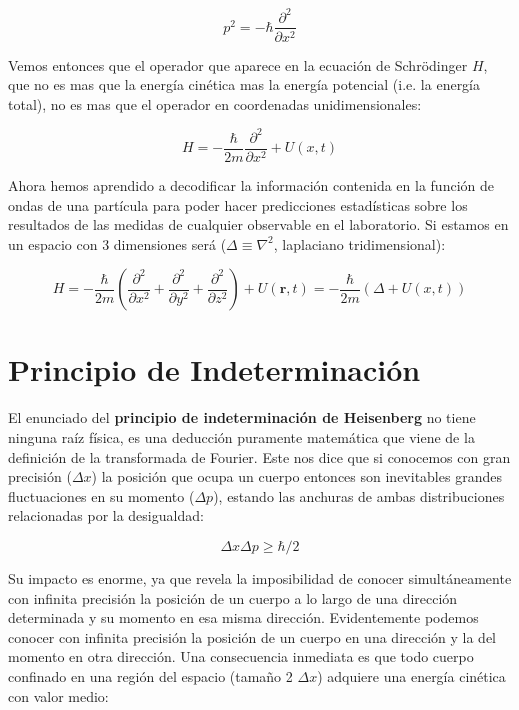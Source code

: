 \documentclass[12pt,a4paper]{article}
\numberwithin{equation}{section}
\numberwithin{figure}{section}
\newcommand{\parentesis}[1]{\left( #1  \right)}
\newcommand{\parciales}[2]{\frac{\partial #1}{\partial #2}}
\newcommand{\rn}{\mathbf{r}}
\begin{document}
\begin{equation}
p^2 = - \hbar \parciales{^2}{x^2}
\end{equation} 

Vemos entonces que el operador que aparece en la ecuación de Schrödinger $H$, que no es mas que la energía cinética mas la energía potencial (i.e. la energía total), no es mas que el operador en coordenadas unidimensionales:


\begin{equation}
H = - \dfrac{\hbar}{2 m} \parciales{^2}{x^2} + U(x,t)
\end{equation}

Ahora hemos aprendido a decodificar la información contenida en la función de ondas de una partícula para poder hacer predicciones estadísticas sobre los resultados de las medidas de cualquier observable en el laboratorio. Si estamos en un espacio con 3 dimensiones será ($\Delta \equiv \nabla^2$, laplaciano tridimensional):

\begin{equation}
H = - \dfrac{\hbar}{2m} \parentesis{\parciales{^2}{x^2}+\parciales{^2}{y^2}+ \parciales{^2}{z^2}} + U(\rn,t) = - \dfrac{\hbar}{2m}(\Delta + U(x,t))
\end{equation}


\section{Principio de Indeterminación}

El enunciado del \textbf{principio de indeterminación de Heisenberg} no tiene ninguna raíz física, es una deducción puramente matemática que viene de la definición de la transformada de Fourier. Este nos dice que si conocemos con gran precisión ($\Delta x$) la posición que ocupa un cuerpo entonces son inevitables grandes fluctuaciones en su momento ($\Delta p$), estando las anchuras de ambas distribuciones  relacionadas por la desigualdad:

\begin{equation}
\Delta x \Delta p \geq \hbar/2
\end{equation}

Su impacto es enorme, ya que revela la imposibilidad de conocer simultáneamente con infinita precisión la posición de un cuerpo a lo largo de una dirección determinada y su momento en esa misma dirección. Evidentemente podemos conocer con infinita precisión la posición de un cuerpo en una dirección y la del momento en otra dirección. Una consecuencia inmediata es que todo cuerpo confinado en una región del espacio (tamaño 2 $\Delta x$) adquiere una energía cinética con valor medio:
\end{document}
